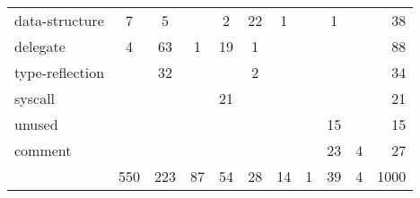 \begin{table}[h]
\begin{tabularx}{\textwidth}{Xccccccccc|r}
                           data-structure &    7 &    5 &     &    2 &  22 &   1 &    &   1 &     &    38 \\
        \rowcolor{verylightgray}
                                 delegate &    4 &   63 &   1 &   19 &   1 &     &    &     &     &    88 \\
                          type-reflection &      &   32 &     &      &   2 &     &    &     &     &    34 \\
        \rowcolor{verylightgray}
                                  syscall &      &      &     &   21 &     &     &    &     &     &    21 \\
                                   unused &      &      &     &      &     &     &    &  15 &     &    15 \\
        \rowcolor{verylightgray}
                                  comment &      &      &     &      &     &     &    &  23 &   4 &    27 \\ \hline
                                       {} &  550 &  223 &  87 &   54 &  28 &  14 &  1 &  39 &   4 &  1000 \\
        \bottomrule
    \end{tabularx}
\end{table}

